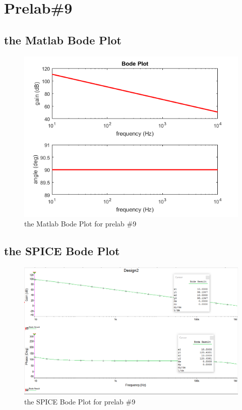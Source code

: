 \documentclass{IEEEtran}
\begin{document}
	\section{\textbf{Prelab\#9}}
	\subsection{the Matlab Bode Plot}
	\begin{figure}[!htbp]
		\centering
		\begin{framed}
			\includegraphics[width=\linewidth]{images/9.png}
			\caption{the Matlab Bode Plot for prelab \#9}
			\label{fig:901}
		\end{framed}
	\end{figure}
	\subsection{the SPICE Bode Plot}
	
	\begin{figure}[!htbp]
		\centering
		\begin{framed}
			\includegraphics[width=\linewidth]{images/9_2.PNG}
			\caption{the SPICE Bode Plot for prelab \#9}
			\label{fig:902}
		\end{framed}
	\end{figure}
\end{document}
